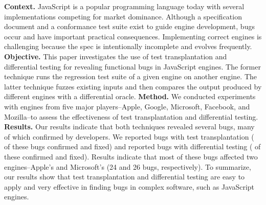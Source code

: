 \textbf{Context.}
JavaScript is a popular programming language today with several
implementations competing for market dominance. Although a
specification document and a conformance test suite exist to guide
engine development, bugs occur and have important practical
consequences. Implementing correct
engines is challenging because the spec is intentionally
incomplete and evolves frequently.
\textbf{Objective.}
This paper investigates the use of test transplantation and
differential testing for revealing functional bugs in JavaScript
engines.  The former technique runs the regression test suite of a
given engine on another engine.  The latter technique fuzzes existing
inputs and then compares the output produced by different engines with
a differential oracle.
\textbf{Method.}
We conducted experiments with engines from five major players--Apple,
Google, Microsoft, Facebook, and Mozilla--to assess the effectiveness
of test transplantation and differential testing.
\textbf{Results.}
Our results indicate that both techniques revealed several bugs, many of which
confirmed by developers. We reported \noBugsTransplantation{} bugs
with test transplantation (\noBugsTransplantationConfirmed{} of these bugs
confirmed and \noBugsTransplantationFixed{} fixed) and reported
\noBugsDifferentialTesting{} bugs with differential testing
(\noBugsDifferentialTestingConfirmed{} of these confirmed
and \noBugsDifferentialTestingFixed{} fixed). Results indicate that
most of these bugs affected two engines--Apple's
\jsc and Microsoft's \chakra{} (24 and 26 bugs, respectively).
To summarize, our results show that
test transplantation and differential testing
are easy to apply and very effective in
finding bugs in complex software, such as JavaScript engines.
